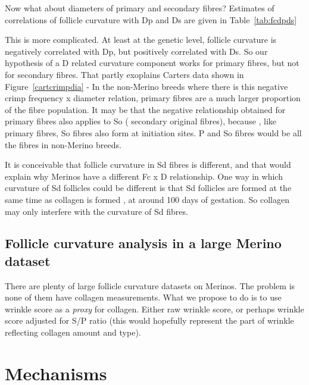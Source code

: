 \documentclass{article}
\begin{document}
Now what about diameters of primary and secondary fibres? Estimates of correlations of follicle curvature with Dp and Ds are given in Table~\ref{tab:fcdpds}

This is more complicated. At least at the genetic level, follicle curvature is negatively correlated with Dp, but positively correlated with Ds. So our hypothesis of a D related curvature component works for primary fibres, but not for secondary fibres. That partly exoplains Carters data shown in Figure~\ref{cartcrimpdia} - In the non-Merino breeds where there is this negative crimp frequency x diameter relation, primary fibres are a much larger proportion of the fibre population. It may be that the negative relationship obtained for primary fibres also applies to So ( secondary original fibres), because , like primary fibres, So fibres also form at initiation sites. P and So fibres would be all the fibres in non-Merino breeds. 

It is conceivable that follicle curvature in Sd fibres is different, and that would explain why Merinos have a different Fc x D relationship. One way in which curvature of Sd follicles could be different is that Sd follicles are formed at the same time as collagen is formed , at around 100 days of gestation. So collagen may only interfere with the curvature of Sd fibres. 

\subsection{ Follicle curvature analysis in a large Merino dataset}
 There are plenty of large follicle curvature datasets on Merinos. The problem is none of them have collagen measurements. What we propose to do is to use wrinkle score as a {\em proxy} for collagen. Either raw wrinkle score, or perhaps wrinkle score adjusted for S/P ratio (this would hopefully represent the part of wrinkle reflecting collagen amount and type).

\section{Mechanisms}




\end{document}
